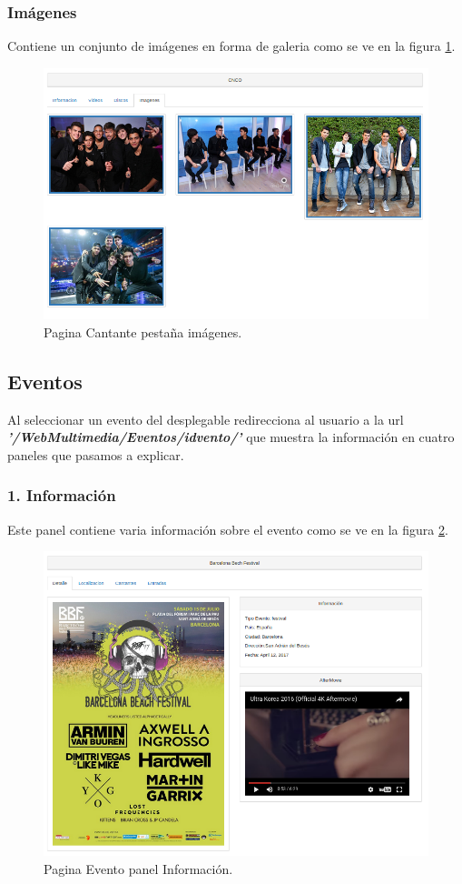\subsubsection*{Imágenes}
Contiene un conjunto de imágenes en forma de galeria como se ve en la figura \ref{fig:Imagenes_Cantante}.
\begin{figure}[!h]
\begin{center}
   \includegraphics[width=0.5\linewidth]{Figures/imagenes_Cantante}
  \decoRule
  \caption[Cantante pestaña imágenes]{Pagina Cantante pestaña imágenes.}
\label{fig:Imagenes_Cantante}
\end{center}
\end{figure}
\subsection*{Eventos}
Al seleccionar un evento del desplegable redirecciona al usuario a la url \textit{\textbf{'/WebMultimedia/Eventos/idvento/'}} que muestra la información en cuatro paneles que pasamos a explicar.
\subsubsection*{1. Información}
Este panel contiene varia información sobre el evento como se ve en la figura \ref{fig:Informacion_Evento}.
\begin{figure}[!h]
\begin{center}
   \includegraphics[width=0.5\linewidth]{Figures/Init_Evento}
  \decoRule
  \caption[Evento panel Información]{Pagina Evento panel Información.}
\label{fig:Informacion_Evento}
\end{center}
\end{figure}
